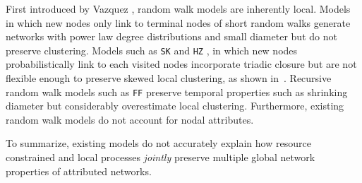 First introduced by Vazquez \cite{vazquez2000knowing}, random walk models are inherently local.
Models \cite{blum2006random} in which
new nodes only link to terminal nodes of short random walks generate
networks with power law degree distributions \cite{chebolu2008pagerank} and
small diameter \cite{mehrabian2016sa} but do not preserve clustering. Models
such as \texttt{SK} \cite{saramaki2004scale}
and \texttt{HZ} \cite{herrera2011generating}, in which new nodes probabilistically link to
each visited nodes incorporate triadic closure but are not flexible enough to preserve
{skewed} local clustering, as shown in~.
Recursive random walk models such as \texttt{FF} \cite{leskovec2005graphs}
preserve temporal properties such as shrinking diameter but considerably overestimate local clustering.
Furthermore, existing random walk models do not account for nodal attributes.

To summarize, existing models do not accurately explain how resource constrained and local processes
\textit{jointly} preserve multiple global network properties of attributed networks.



